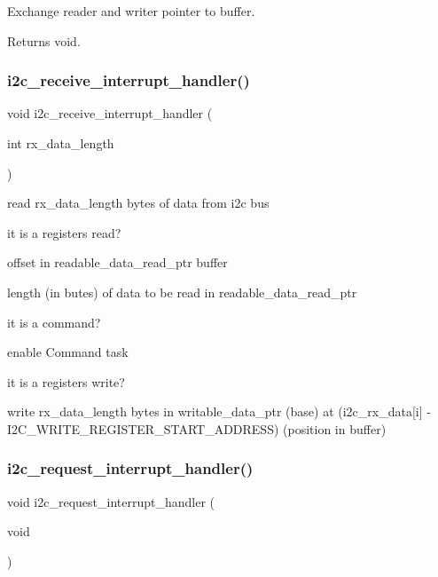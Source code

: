 Exchange reader and writer pointer to buffer. 

\begin{DoxyReturn}{Returns}
void. 
\end{DoxyReturn}
\mbox{\label{i2c-rain_8ino_a6e27532df66f6bf186654355def5c9af}} 
\subsubsection{\texorpdfstring{i2c\+\_\+receive\+\_\+interrupt\+\_\+handler()}{i2c\_receive\_interrupt\_handler()}}
{\footnotesize\ttfamily void i2c\+\_\+receive\+\_\+interrupt\+\_\+handler (\begin{DoxyParamCaption}\item[{int}]{rx\+\_\+data\+\_\+length }\end{DoxyParamCaption})}

read rx\+\_\+data\+\_\+length bytes of data from i2c bus

it is a registers read?

offset in readable\+\_\+data\+\_\+read\+\_\+ptr buffer

length (in butes) of data to be read in readable\+\_\+data\+\_\+read\+\_\+ptr

it is a command?

enable Command task

it is a registers write?

write rx\+\_\+data\+\_\+length bytes in writable\+\_\+data\+\_\+ptr (base) at (i2c\+\_\+rx\+\_\+data\mbox{[}i\mbox{]} -\/ I2\+C\+\_\+\+W\+R\+I\+T\+E\+\_\+\+R\+E\+G\+I\+S\+T\+E\+R\+\_\+\+S\+T\+A\+R\+T\+\_\+\+A\+D\+D\+R\+E\+SS) (position in buffer) \mbox{\label{i2c-rain_8ino_ac816bd8aafe77e7a571574c8a26eead5}} 
\subsubsection{\texorpdfstring{i2c\+\_\+request\+\_\+interrupt\+\_\+handler()}{i2c\_request\_interrupt\_handler()}}
{\footnotesize\ttfamily void i2c\+\_\+request\+\_\+interrupt\+\_\+handler (\begin{DoxyParamCaption}\item[{void}]{ }\end{DoxyParamCaption})}



